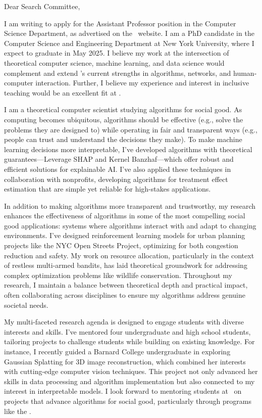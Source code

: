 \documentclass[11pt]{article}
\begin{document}
{\setlength{\parindent}{0cm}

Dear Search Committee,

I am writing to apply for the Assistant Professor position in the Computer Science Department, as advertised on the \school~website. I am a PhD candidate in the Computer Science and Engineering Department at New York University, where I expect to graduate in May 2025. I believe my work at the intersection of theoretical computer science, machine learning, and data science would complement and extend \school’s current strengths in algorithms, networks, and human-computer interaction. Further, I believe my experience and interest in inclusive teaching would be an excellent fit at \school.

I am a theoretical computer scientist studying algorithms for social good. As computing becomes ubiquitous, algorithms should be effective (e.g., solve the problems they are designed to) while operating in fair and transparent ways (e.g., people can trust and understand the decisions they make). To make machine learning decisions more interpretable, I’ve developed algorithms with theoretical guarantees—Leverage SHAP and Kernel Banzhaf—which offer robust and efficient solutions for explainable AI. I’ve also applied these techniques in collaboration with nonprofits, developing algorithms for treatment effect estimation that are simple yet reliable for high-stakes applications.

In addition to making algorithms more transparent and trustworthy, my research enhances the effectiveness of algorithms in some of the most compelling social good applications: systems where algorithms interact with and adapt to changing environments. I’ve designed reinforcement learning models for urban planning projects like the NYC Open Streets Project, optimizing for both congestion reduction and safety. My work on resource allocation, particularly in the context of restless multi-armed bandits, has laid theoretical groundwork for addressing complex optimization problems like wildlife conservation. Throughout my research, I maintain a balance between theoretical depth and practical impact, often collaborating across disciplines to ensure my algorithms address genuine societal needs.

My multi-faceted research agenda is designed to engage students with diverse interests and skills. I've mentored four undergraduate and high school students, tailoring projects to challenge students while building on existing knowledge. For instance, I recently guided a Barnard College undergraduate in exploring Gaussian Splatting for 3D image reconstruction, which combined her interests with cutting-edge computer vision techniques. This project not only advanced her skills in data processing and algorithm implementation but also connected to my interest in interpretable models. I look forward to mentoring students at \school~on projects that advance algorithms for social good, particularly through programs like the \program.

}
\end{document}
